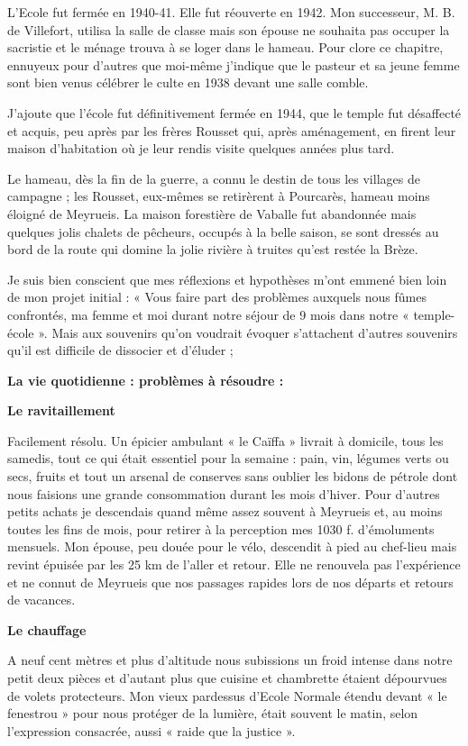 
L’Ecole fut fermée en 1940-41. Elle fut réouverte en 1942. Mon successeur, M. B. de
Villefort, utilisa la salle de classe mais son épouse ne souhaita pas occuper la sacristie
et le ménage trouva à se loger dans le hameau.
Pour clore ce chapitre, ennuyeux pour d’autres que moi-même j’indique que le
pasteur et sa jeune femme sont bien venus célébrer le culte en 1938 devant une salle
comble.

J’ajoute que l’école fut définitivement fermée en 1944, que le temple fut désaffecté et
acquis, peu après par les frères Rousset qui, après aménagement, en firent leur maison
d’habitation où je leur rendis visite quelques années plus tard.

Le hameau, dès la fin de la guerre, a connu le destin de tous les villages de
campagne ; les Rousset, eux-mêmes se retirèrent à Pourcarès, hameau moins éloigné
de Meyrueis. La maison forestière de Vaballe fut abandonnée mais quelques jolis
chalets de pêcheurs, occupés à la belle saison, se sont dressés au bord de la route qui
domine la jolie rivière à truites qu’est restée la Brèze.

Je suis bien conscient que mes réflexions et hypothèses m’ont emmené bien loin de
mon projet initial : « Vous faire part des problèmes auxquels nous fûmes confrontés,
ma femme et moi durant notre séjour de 9 mois dans notre « temple-école ». Mais aux
souvenirs qu’on voudrait évoquer s’attachent d’autres souvenirs qu’il est difficile de
dissocier et d’éluder ;

\begin{center}
\textbf{La vie quotidienne : problèmes à résoudre :}
\end{center}

\textbf{Le ravitaillement}

Facilement résolu. Un épicier ambulant « le Caïffa » livrait à domicile, tous les
samedis, tout ce qui était essentiel pour la semaine : pain, vin, légumes verts ou secs,
fruits et tout un arsenal de conserves sans oublier les bidons de pétrole dont nous
faisions une grande consommation durant les mois d’hiver.
Pour d’autres petits achats je descendais quand même assez souvent à Meyrueis et, au
moins toutes les fins de mois, pour retirer à la perception mes 1030 f. d’émoluments
mensuels. Mon épouse, peu douée pour le vélo, descendit à pied au chef-lieu mais
revint épuisée par les 25 km de l’aller et retour. Elle ne renouvela pas l’expérience et
ne connut de Meyrueis que nos passages rapides lors de nos départs et retours de
vacances.

\textbf{Le chauffage}

A neuf cent mètres et plus d’altitude nous subissions un froid intense dans notre petit
deux pièces et d’autant plus que cuisine et chambrette étaient dépourvues de volets
protecteurs. Mon vieux pardessus d’Ecole Normale étendu devant « le fenestrou »
pour nous protéger de la lumière, était souvent le matin, selon l’expression consacrée,
aussi « raide que la justice ».
